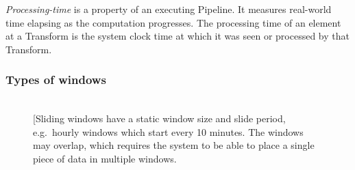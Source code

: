 \emph{Processing-time} is a property of an executing Pipeline.
It measures real-world time elapsing as the computation progresses.
The processing time of an element at a Transform is the system clock time at which it was seen or processed by that Transform.

\subsubsection{Types of windows}

\begin{figure}[h]
	\\
	\subfloat[][Sliding windows have a static window size and slide period, e.g.\ hourly windows which start every 10 minutes.
The windows may overlap, which requires the system to be able to place a single piece of data in multiple windows.

\end{figure}
